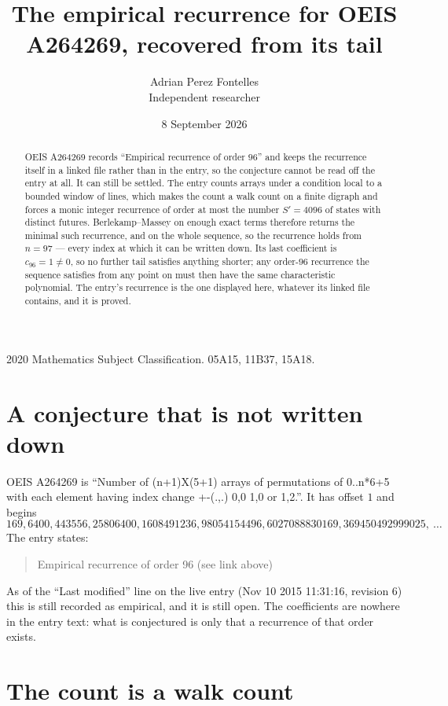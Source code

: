\documentclass[11pt,a4paper]{article}
\title{The empirical recurrence for OEIS A264269, recovered from its tail}
\author{Adrian Perez Fontelles\\ \small Independent researcher}
\date{8 September 2026}
\theoremstyle{plain}
\theoremstyle{definition}
\begin{document}
\maketitle

\begin{abstract}
OEIS A264269 records ``Empirical recurrence of order $96$'' and keeps the recurrence itself in
a linked file rather than in the entry, so the conjecture cannot be read off the entry at all.
It can still be settled. The entry counts arrays under a condition local to a bounded window of
lines, which makes the count a walk count on a finite digraph and forces a monic integer
recurrence of order at most the number $S'=4096$ of states with distinct futures. Berlekamp--Massey on
enough exact terms therefore returns the minimal such recurrence, and on the whole sequence, so the recurrence holds from $n=97$ --- every index at which it can be written down.
Its last coefficient is $c_{96}=1\neq0$, so no further tail satisfies anything
shorter; any order-$96$ recurrence the sequence satisfies from any point on must then have
the same characteristic polynomial. The entry's recurrence is the one displayed here, whatever
its linked file contains, and it is proved.
\end{abstract}

\noindent\small 2020 Mathematics Subject Classification. 05A15, 11B37, 15A18.\normalsize

\section{A conjecture that is not written down}

OEIS A264269 is ``Number of (n+1)X(5+1) arrays of permutations of 0..n*6+5 with each element having index change +-(.,.) 0,0 1,0 or 1,2.''. It has offset $1$ and begins
\[
169, 6400, 443556, 25806400, 1608491236, 98054154496, 6027088830169, 369450492999025,\ \dots
\]
The entry states:
\begin{quote}
Empirical recurrence of order 96 (see link above)
\end{quote}
As of the ``Last modified'' line on the live entry (Nov 10 2015 11:31:16, revision 6)
this is still recorded as empirical, and it is still open. The coefficients are nowhere in the
entry text: what is conjectured is only that a recurrence of that order exists.

\section{The count is a walk count}
\end{document}
